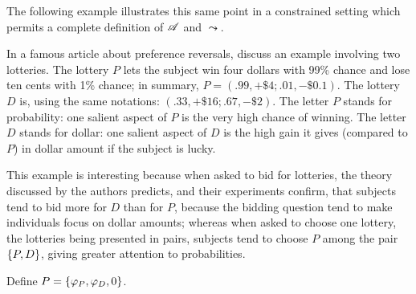 \documentclass[version=last, pagesize, twoside=off, bibliography=totoc, DIV=calc, fontsize=12pt, a4paper, french, english]{scrartcl}
\begin{document}
The following example illustrates this same point in a constrained setting which permits a complete definition of $\mathscr{A}$ and $\leadsto$.%
\begin{example}
	\label{ex:lichtenstein}
	In a famous article about preference reversals, \citet{lichtenstein_reversals_2006} discuss an example involving two lotteries. The lottery $P$ lets the subject win four dollars with 99\% chance and lose ten cents with 1\% chance; in summary, $P = (.99, +\$4; .01, −\$0.1)$. The lottery $D$ is, using the same notations: $(.33, +\$16; .67, −\$2)$. The letter $P$ stands for probability: one salient aspect of $P$ is the very high chance of winning. The letter $D$ stands for dollar: one salient aspect of $D$ is the high gain it gives (compared to $P$) in dollar amount if the subject is lucky.

This example is interesting because when asked to bid for lotteries, the theory discussed by the authors predicts, and their experiments confirm, that subjects tend to bid more for $D$ than for $P$, because the bidding question tend to make individuals focus on dollar amounts; whereas when asked to choose one lottery, the lotteries being presented in pairs, subjects tend to choose $P$ among the pair $\{P, D\}$, giving greater attention to probabilities.

Define $P = \{\varphi_P, \varphi_D, 0\}$.


\end{example}
\end{document}
